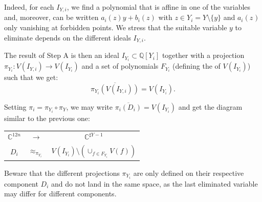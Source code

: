 \begin{itemize}
  Indeed, for each $I_{Y,i}$, we find a polynomial that is affine in
  one of the variables and, moreover, can be written $a_{i} ( z ) y+b_{i} ( z
  )$ with $z \in Y_{i} =Y \setminus \{ y \}$ and $a_{i} ( z^{} )$ only vanishing at forbidden points. We stress that 
  the suitable variable $y$ to eliminate depends on the different ideals $I_{Y,i}$.
  
  The result of Step A is then an ideal $I_{Y_{i}} \subset \mathbb{Q}
  [ Y_{i} ]$ together with a projection $\pi_{Y_{i}} :V ( I_{Y,i} ) \rightarrow V (
  I_{Y_{i}} )$ and a set of polynomials
  $F_{Y_{i}}$ (defining the {} of $V ( I_{Y_{i}} )$)
  such that we get: $$\overline{\pi_{Y_{i}} ( V ( I_{Y,i} ) )} =V ( I_{Y_{i}} ).$$
  
  Setting $\pi_{i} = \pi_{Y_{i}} \circ \pi_{Y}$, we may write
  $\overline{\pi_{i} ( D_{i} )} =V ( I_{Y_{i}} )$ and get the diagram similar to the previous 
  one:
 
\begin{center}
    \begin{tabular}{ccc}
      $\mathbb{C}^{12n}$ & $\rightarrow$ & $\mathbb{C}^{\sharp Y-1}$ \\

      $D_{i}$ & $\approx_{\pi_{Y_i}}$ & $V ( I_{Y_i} ) \setminus ( \cup_{f \in
      F_{Y_i}} V ( f ) )$ \\
%
%
    \end{tabular}
\end{center}
%
%
%
Beware that the different projections $\pi_{Y_i}$ are only defined on their respective component $D_i$ and do not land in the same space, as the last eliminated variable may differ for different components.
  

\end{itemize}

